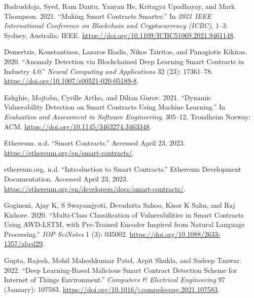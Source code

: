 \documentclass[
  11pt,
]{article}
\newlength{\cslhangindent}
\newlength{\cslentryspacingunit} %
\newenvironment{CSLReferences}[2] %
 {%
  \setlength{\parindent}{0pt}
  \ifodd #1
  \let\oldpar\par
  \def\par{\hangindent=\cslhangindent\oldpar}
  \fi
  \setlength{\parskip}{#2\cslentryspacingunit}
 }%
 {}
\begin{document}
\hypertarget{refs}{}
\begin{CSLReferences}{1}{0}
\leavevmode{}%
Badruddoja, Syed, Ram Dantu, Yanyan He, Kritagya Upadhayay, and Mark
Thompson. 2021. {``Making Smart Contracts Smarter.''} In \emph{2021
{IEEE} {International} {Conference} on {Blockchain} and {
Cryptocurrency} ({ICBC})}, 1--3. Sydney, Australia: IEEE.
\url{https://doi.org/10.1109/ICBC51069.2021.9461148}.

\leavevmode{}%
Demertzis, Konstantinos, Lazaros Iliadis, Nikos Tziritas, and Panagiotis
Kikiras. 2020. {``Anomaly Detection via Blockchained Deep Learning Smart
Contracts in Industry 4.0.''} \emph{Neural Computing and Applications}
32 (23): 17361--78. \url{https://doi.org/10.1007/s00521-020-05189-8}.

\leavevmode{}%
Eshghie, Mojtaba, Cyrille Artho, and Dilian Gurov. 2021. {``Dynamic
Vulnerability Detection on Smart Contracts Using Machine Learning.''} In
\emph{Evaluation and {Assessment} in {Software} {Engineering}}, 305--12.
Trondheim Norway: ACM. \url{https://doi.org/10.1145/3463274.3463348}.

\leavevmode{}%
Ethereum. n.d. {``Smart Contracts.''} Accessed April 23, 2023.
\url{https://ethereum.org/en/smart-contracts/}.

\leavevmode{}%
ethereum.org. n.d. {``Introduction to Smart Contracts.''} Ethereum
Development Documentation. Accessed April 23, 2023.
\url{https://ethereum.org/en/developers/docs/smart-contracts/}.

\leavevmode{}%
Gogineni, Ajay K, S Swayamjyoti, Devadatta Sahoo, Kisor K Sahu, and Raj
Kishore. 2020. {``Multi-{Class} Classification of Vulnerabilities in
Smart Contracts Using {AWD}-{LSTM}, with Pre-Trained Encoder Inspired
from Natural Language Processing.''} \emph{IOP SciNotes} 1 (3): 035002.
\url{https://doi.org/10.1088/2633-1357/abcd29}.

\leavevmode{}%
Gupta, Rajesh, Mohil Maheshkumar Patel, Arpit Shukla, and Sudeep Tanwar.
2022. {``Deep Learning-Based Malicious Smart Contract Detection Scheme
for Internet of Things Environment.''} \emph{Computers \& Electrical
Engineering} 97 (January): 107583.
\url{https://doi.org/10.1016/j.compeleceng.2021.107583}.


\end{CSLReferences}
\end{document}
